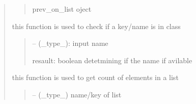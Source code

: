 \documentclass[letterpaper,10pt,english]{sphinxmanual}
\begin{document}
\begin{quote}
\begin{savenotes}
\begin{fulllineitems}
\begin{savenotes}
\begin{fulllineitems}
\begin{quote}
\begin{description}
\sphinxAtStartPar
prev\_on\_list oject

\end{description}\end{quote}

\end{fulllineitems}\end{savenotes}


\begin{savenotes}\begin{fulllineitems}
\label{\detokenize{setting/utils/move_on_list:oxin.utils.move_on_list.moveOnList.check}}
\pysigstartsignatures
{}
\pysigstopsignatures
\sphinxAtStartPar
this function is used to check if a key/name is in class
\begin{quote}\begin{description}
\sphinxAtStartPar
{} – (\_type\_): input name

\sphinxAtStartPar
resault: boolean detetmining if the name if avilable

\end{description}\end{quote}

\end{fulllineitems}\end{savenotes}


\begin{savenotes}\begin{fulllineitems}
\label{\detokenize{setting/utils/move_on_list:oxin.utils.move_on_list.moveOnList.get_count}}
\pysigstartsignatures
{}
\pysigstopsignatures
\sphinxAtStartPar
this function is used to get count of elements in a list
\begin{quote}\begin{description}
\sphinxAtStartPar
{} – (\_type\_) name/key of list


\end{description}
\end{quote}
\end{fulllineitems}
\end{savenotes}
\end{fulllineitems}
\end{savenotes}
\end{quote}
\end{document}
